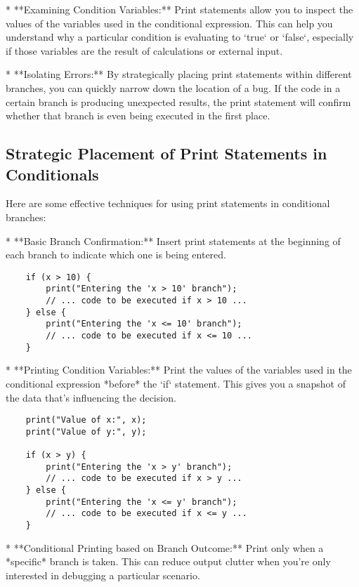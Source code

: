 \documentclass{article}
\begin{document}
{{{*   **Examining Condition Variables:** Print statements allow you to inspect the values of the variables used in the conditional expression.  This can help you understand why a particular condition is evaluating to `true` or `false`, especially if those variables are the result of calculations or external input.

*   **Isolating Errors:** By strategically placing print statements within different branches, you can quickly narrow down the location of a bug. If the code in a certain branch is producing unexpected results, the print statement will confirm whether that branch is even being executed in the first place.

\subsection*{Strategic Placement of Print Statements in Conditionals}

Here are some effective techniques for using print statements in conditional branches:

*   **Basic Branch Confirmation:** Insert print statements at the beginning of each branch to indicate which one is being entered.

    \begin{verbatim}
    if (x > 10) {
        print("Entering the 'x > 10' branch");
        // ... code to be executed if x > 10 ...
    } else {
        print("Entering the 'x <= 10' branch");
        // ... code to be executed if x <= 10 ...
    }
    \end{verbatim}

*   **Printing Condition Variables:**  Print the values of the variables used in the conditional expression *before* the `if` statement. This gives you a snapshot of the data that's influencing the decision.

    \begin{verbatim}
    print("Value of x:", x);
    print("Value of y:", y);

    if (x > y) {
        print("Entering the 'x > y' branch");
        // ... code to be executed if x > y ...
    } else {
        print("Entering the 'x <= y' branch");
        // ... code to be executed if x <= y ...
    }
    \end{verbatim}

*   **Conditional Printing based on Branch Outcome:** Print only when a *specific* branch is taken. This can reduce output clutter when you're only interested in debugging a particular scenario.

}}}
\end{document}
